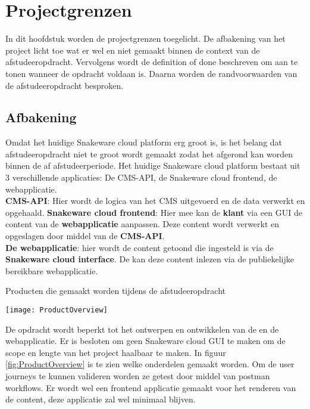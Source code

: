 \chapter{Projectgrenzen}
In dit hoofdstuk worden de projectgrenzen toegelicht.
De afbakening van het project licht toe wat er wel en niet gemaakt binnen de context van de afstudeeropdracht.
Vervolgens wordt de definition of done beschreven om aan te tonen wanneer de opdracht voldaan is.
Daarna worden de randvoorwaarden van de afstudeeropdracht besproken.
\section{Afbakening}
Omdat het huidige Snakeware cloud platform erg groot is, is het belang dat afstudeeropdracht niet te groot wordt gemaakt zodat het afgerond kan worden binnen de af afstudeerperiode.
Het huidige Snakeware cloud platform bestaat uit 3 verschillende applicaties: De \gls{CMS}-API, de Snakeware cloud frontend, de webapplicatie.\\
\textbf{CMS-API}: Hier wordt de logica van het CMS uitgevoerd en de data verwerkt en opgehaald.
\textbf{Snakeware cloud frontend}: Hier mee kan de \textbf{klant} via een \gls{GUI} de content van de \textbf{webapplicatie} aanpassen.
Deze content wordt verwerkt en opgeslagen door middel van de \textbf{\gls{CMS}-API}.\\
\textbf{De webapplicatie}: hier wordt de content getoond die ingesteld is via de \textbf{Snakeware cloud interface}.
De  kan deze content inlezen via de publiekelijke bereikbare webapplicatie.
\begin{graphic}
    \captionsetup{type=figure}
    \caption{Producten die gemaakt worden tijdens de afstudeeropdracht}
    \texttt{[image: ProductOverview]}
    \label{fig:ProductOverview}
\end{graphic}
\whitespace
De opdracht wordt beperkt tot het ontwerpen en ontwikkelen van de  en de webapplicatie.
Er is besloten om geen Snakeware cloud \gls{GUI} te maken om de scope en lengte van het project haalbaar te maken.
In figuur \ref{fig:ProductOverview} is te zien welke onderdelen gemaakt worden.
Om de user journeys te kunnen valideren worden ze getest door middel van postman workflows.
Er wordt wel een frontend applicatie gemaakt voor het renderen van de content, deze applicatie zal wel minimaal blijven.
\whitespace
